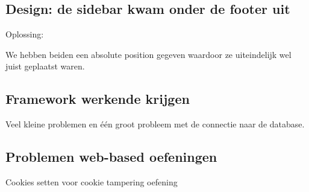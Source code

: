 \subsection{Design: de sidebar kwam onder de footer uit}
Oplossing:

We hebben beiden een absolute position gegeven waardoor ze uiteindelijk wel juist geplaatst waren.

\subsection{Framework werkende krijgen}
Veel kleine problemen en \'e\'en groot probleem met de connectie naar de database.

\subsection{Problemen web-based oefeningen}
Cookies setten voor cookie tampering oefening 